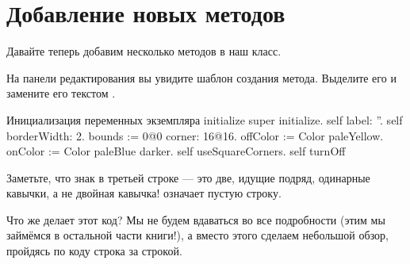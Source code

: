 \documentclass[a4paper,10pt,twoside]{book}
\begin{document}
\section{Добавление новых методов}

Давайте теперь добавим несколько методов в наш класс.

На панели редактирования вы увидите шаблон создания метода.
Выделите его и замените его текстом .

\begin{numMethod}[scbecellinitialize]{Инициализация переменных экземпляра }
initialize
   super initialize.
   self label: ''.
   self borderWidth: 2.
   bounds := 0@0 corner: 16@16.
   offColor := Color paleYellow.
   onColor := Color paleBlue darker.
   self useSquareCorners.
   self turnOff
\end{numMethod}

\noindent
Заметьте, что знак  в третьей строке --- это две, идущие подряд, одинарные кавычки, а не двойная кавычка!  означает пустую строку.


Что же делает этот код? Мы не будем вдаваться во все подробности (этим мы займёмся в остальной части книги!), а вместо этого сделаем небольшой обзор, пройдясь по коду строка за строкой.
\end{document}
